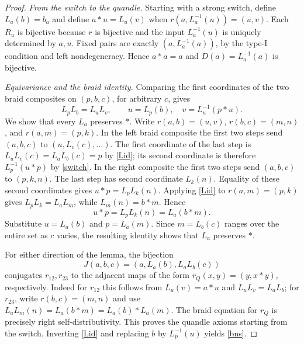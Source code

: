 \documentclass[11pt,a4paper]{article}
\begin{document}
\begin{proof}
\emph{From the switch to the quandle.} Starting with a strong switch, define $L_a(b)=b_a$ and define $a*u=L_u(v)$ when $r(a,L_a^{-1}(u))=(u,v)$. Each $R_u$ is bijective because $r$ is bijective and the input $L_a^{-1}(u)$ is uniquely determined by $a,u$. Fixed pairs are exactly $(a,L_a^{-1}(a))$, by the type-I condition and left nondegeneracy. Hence $a*a=a$ and $D(a)=L_a^{-1}(a)$ is bijective.

\emph{Equivariance and the braid identity.} Comparing the first coordinates of the two braid composites on $(p,b,c)$, for arbitrary $c$, gives
\begin{equation}\label{Lid}
L_p L_b=L_u L_v,\qquad u=L_p(b),\quad v=L_u^{-1}(p*u).
\end{equation}
We show that every $L_a$ preserves $*$. Write $r(a,b)=(u,v)$, $r(b,c)=(m,n)$, and $r(a,m)=(p,k)$. In the left braid composite the first two steps send $(a,b,c)$ to $(u,L_v(c),\ldots)$. The first coordinate of the last step is $L_uL_v(c)=L_aL_b(c)=p$ by \eqref{Lid}; its second coordinate is therefore $L_p^{-1}(u*p)$ by \eqref{switch}. In the right composite the first two steps send $(a,b,c)$ to $(p,k,n)$. The last step has second coordinate $L_k(n)$. Equality of these second coordinates gives $u*p=L_pL_k(n)$. Applying \eqref{Lid} to $r(a,m)=(p,k)$ gives $L_pL_k=L_aL_m$, while $L_m(n)=b*m$. Hence
\[
u*p=L_p L_k(n)=L_a(b*m).
\]
Substitute $u=L_a(b)$ and $p=L_a(m)$. Since $m=L_b(c)$ ranges over the entire set as $c$ varies, the resulting identity shows that $L_a$ preserves $*$.

For either direction of the lemma, the bijection
\[
J(a,b,c)=(a,L_a(b),L_aL_b(c))
\]
conjugates $r_{12},r_{23}$ to the adjacent maps of the form $r_Q(x,y)=(y,x*y)$, respectively. Indeed for $r_{12}$ this follows from $L_u(v)=a*u$ and $L_uL_v=L_aL_b$; for $r_{23}$, write $r(b,c)=(m,n)$ and use $L_aL_m(n)=L_a(b*m)=L_a(b)*L_a(m)$. The braid equation for $r_Q$ is precisely right self-distributivity. This proves the quandle axioms starting from the switch. Inverting \eqref{Lid} and replacing $b$ by $L_p^{-1}(u)$ yields \eqref{bns}.


\end{proof}
\end{document}
